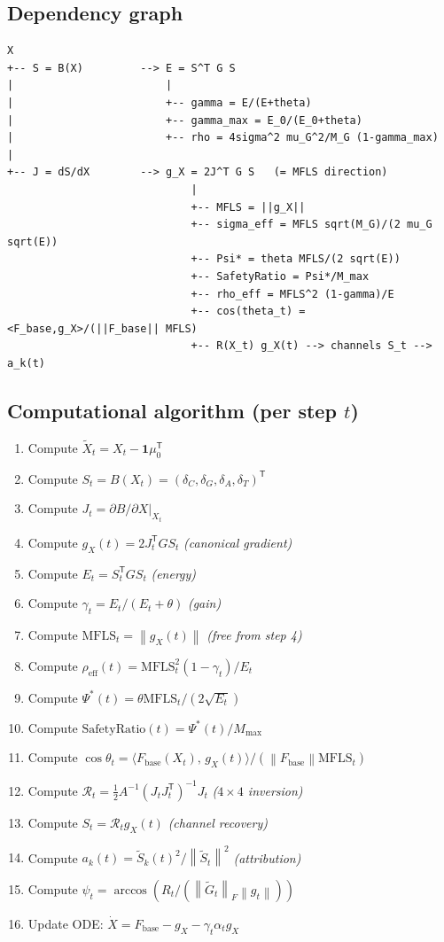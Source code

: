 \documentclass[11pt,a4paper]{article}
\theoremstyle{definition}
\newcommand{\T}{^{\mathsf{T}}}
\newcommand{\norm}[1]{\left\|#1\right\|}
\newcommand{\inner}[2]{\langle #1,\,#2\rangle}
\newcommand{\Fbase}{F_{\mathrm{base}}}
\newcommand{\gX}{g_X}
\newcommand{\mfls}{\mathrm{MFLS}}
\begin{document}
\subsection{Dependency graph}

\begin{verbatim}
X
+-- S = B(X)         --> E = S^T G S
|                        |
|                        +-- gamma = E/(E+theta)
|                        +-- gamma_max = E_0/(E_0+theta)
|                        +-- rho = 4sigma^2 mu_G^2/M_G (1-gamma_max)
|
+-- J = dS/dX        --> g_X = 2J^T G S   (= MFLS direction)
                             |
                             +-- MFLS = ||g_X||
                             +-- sigma_eff = MFLS sqrt(M_G)/(2 mu_G sqrt(E))
                             +-- Psi* = theta MFLS/(2 sqrt(E))
                             +-- SafetyRatio = Psi*/M_max
                             +-- rho_eff = MFLS^2 (1-gamma)/E
                             +-- cos(theta_t) = <F_base,g_X>/(||F_base|| MFLS)
                             +-- R(X_t) g_X(t) --> channels S_t --> a_k(t)
\end{verbatim}

\subsection{Computational algorithm (per step $t$)}

\begin{enumerate}
\item Compute $\tilde X_t = X_t - \mathbf{1}\mu_0\T$
\item Compute $S_t = B(X_t) = (\delta_C,\delta_G,\delta_A,\delta_T)\T$
\item Compute $J_t = \partial B/\partial X|_{X_t}$
\item Compute $\gX(t) = 2J_t\T G S_t$ \hfill \textit{(canonical gradient)}
\item Compute $E_t = S_t\T G S_t$ \hfill \textit{(energy)}
\item Compute $\gamma_t = E_t/(E_t+\theta)$ \hfill \textit{(gain)}
\item Compute $\mfls_t = \norm{\gX(t)}$ \hfill \textit{(free from step 4)}
\item Compute $\rho_\mathrm{eff}(t) = \mfls_t^2(1-\gamma_t)/E_t$
\item Compute $\Psi^*(t) = \theta\mfls_t/(2\sqrt{E_t})$
\item Compute $\mathrm{SafetyRatio}(t) = \Psi^*(t)/M_\mathrm{max}$
\item Compute $\cos\theta_t = \inner{F_\mathrm{base}(X_t)}{\gX(t)}/(\norm{F_\mathrm{base}}\mfls_t)$
\item Compute $\mathcal{R}_t = \frac{1}{2}A^{-1}(J_tJ_t\T)^{-1}J_t$ \hfill \textit{($4\times4$ inversion)}
\item Compute $S_t = \mathcal{R}_t\gX(t)$ \hfill \textit{(channel recovery)}
\item Compute $a_k(t) = \tilde S_k(t)^2/\norm{\tilde S_t}^2$ \hfill \textit{(attribution)}
\item Compute $\psi_t = \arccos(R_t/(\norm{\tilde G_t}_F\norm{g_t}))$
\item Update ODE: $\dot X = \Fbase - \gX - \gamma_t\alpha_t\gX$
\end{enumerate}
\end{document}
